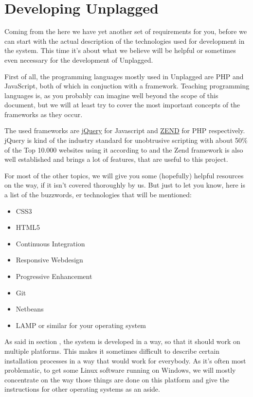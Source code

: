 \chapter{Developing Unplagged}\label{chap:developingUnplagged}

Coming from the  here we have yet another set of requirements for you, before we can
start with the actual description of the technologies used for development in the system. This time it's 
about what we believe will be helpful or sometimes even necessary for the development of Unplagged. 

First of all, the programming languages mostly used in Unplagged are PHP and JavaScript, both of which in conjuction
with a framework. Teaching programming languages is, as you probably can imagine well beyond the scope of this document,
but we will at least try to cover the most important concepts of the frameworks as they occur. 

The used frameworks are 
\href{http://jquery.com/}{jQuery} for Javascript and \href{http://framework.zend.com/docs/overview}{ZEND} for PHP 
respectively. jQuery is kind of the industry standard for unobtrusive scripting with about 50\% 
of the Top 10.000 websites using it according to \citet*{Trends} and the Zend framework is also well established and
brings a lot of features, that are useful to this project.

For most of the other topics, we will give you some (hopefully) helpful resources on the way, if it isn't covered 
thoroughly by us. But just to let you
know, here is a list of the buzzwords, er technologies that will be mentioned:

\begin{itemize}
\item CSS3
\item HTML5
\item Continuous Integration
\item Responsive Webdesign
\item Progressive Enhancement
\item Git
\item Netbeans
\item LAMP or similar for your operating system
\end{itemize}

As said in section , the system is developed in a way, so that it should work on multiple platforms. 
This makes it sometimes difficult to describe certain installation processes in a way that would work for everybody. As
it's often most problematic, to get some Linux software running on Windows, we will mostly concentrate on the way those
things are done on this platform and give the instructions for other operating systems as an aside.

